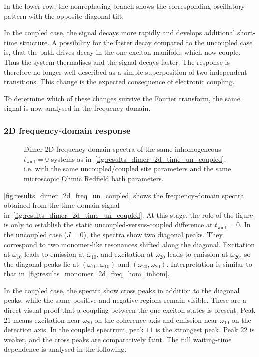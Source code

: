 In the lower row, the nonrephasing branch shows the corresponding oscillatory pattern with the opposite diagonal tilt.

In the coupled case, the signal decays more rapidly and develops additional short-time structure.  A possibility for the faster decay compared to the uncoupled case is, that the bath drives decay in the one-exciton manifold, which now couple. Thus the system thermalises and the signal decays faster.
The response is therefore no longer well described as a simple superposition of two independent transitions. This change is the expected consequence of electronic coupling.

To determine which of these changes survive the Fourier transform, the same signal is now analysed in the frequency domain.
\subsubsection{2D frequency-domain response}

\begin{figure}[htbp]
    \centering
    \caption{Dimer 2D frequency-domain spectra of the same inhomogeneous $t_{\mathrm{wait}}=0$ systems as in~\autoref{fig:results_dimer_2d_time_un_coupled}, i.e. with the same uncoupled/coupled site parameters and the same microscopic Ohmic Redfield bath parameters.}
    \label{fig:results_dimer_2d_freq_un_coupled}
\end{figure}

\autoref{fig:results_dimer_2d_freq_un_coupled} shows the frequency-domain spectra obtained from the time-domain signal in~\autoref{fig:results_dimer_2d_time_un_coupled}. At this stage, the role of the figure is only to establish the static uncoupled-versus-coupled difference at $t_{\mathrm{wait}}=0$.
In the uncoupled case ($J=0$), the spectra show two diagonal peaks. They correspond to two monomer-like resonances shifted along the diagonal. Excitation at $\omega_{10}$ leads to emission at $\omega_{10}$, and excitation at $\omega_{20}$ leads to emission at $\omega_{20}$, so the diagonal peaks lie at $(\omega_{10},\omega_{10})$ and $(\omega_{20},\omega_{20})$. Interpretation is similar to that in~\autoref{fig:results_monomer_2d_freq_hom_inhom}.

In the coupled case, the spectra show cross peaks in addition to the diagonal peaks, while the same positive and negative regions remain visible. These are a direct visual proof that a coupling between the one-exciton states is present. Peak $21$ means excitation near $\omega_{20}$ on the coherence axis and emission near $\omega_{10}$ on the detection axis. In the coupled spectrum, peak $11$ is the strongest peak. Peak $22$ is weaker, and the cross peaks are comparatively faint. The full waiting-time dependence is analysed in the following.

